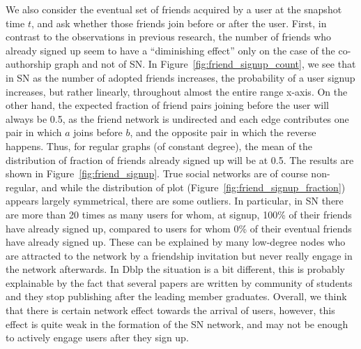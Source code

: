 \documentclass[phd,tocprelim]{cornell}
\begin{document}
We also consider the eventual set of friends acquired by a user at the snapshot time $t$, and
ask whether those friends join before or after the user.  First, in contrast to the observations in previous research\cite{Backstrom:2006}, the number of friends who already signed up seem to have a ``diminishing effect'' only on the case of the co-authorship graph and not of SN. In Figure~\ref{fig:friend_signup_count}, we see that in SN as the number of adopted friends increases, the probability of a user signup increases, but rather linearly, throughout almost the entire range x-axis. On the other hand, the expected
fraction of friend pairs joining before the user will always be 0.5, as the friend network is undirected and each edge contributes one pair in
which $a$ joins before $b$, and the opposite pair in which the reverse
happens.  Thus, for regular graphs (of constant degree), the mean of
the distribution of fraction of friends already signed up will be at
0.5.  The results are shown in Figure~\ref{fig:friend_signup}.  True
social networks are of course non-regular, and while the distribution
of plot (Figure~\ref{fig:friend_signup_fraction}) appears largely symmetrical, there are some outliers.  In particular, in SN there are more than 20 times as many users for whom, at
signup, 100\% of their friends have already signed up, compared to
users for whom 0\% of their eventual friends have already signed up. These can be explained by many low-degree nodes who are attracted to the network by a friendship invitation but never really engage in the network afterwards. In Dblp the situation is a bit different, this is probably explainable by the fact that several papers are written by community of students and they stop publishing after the leading member graduates. Overall, we think that there is certain network effect towards the arrival of users, however, this effect is quite weak in the formation of the SN network, and may not be enough to actively engage users after they sign up.


\end{document}
